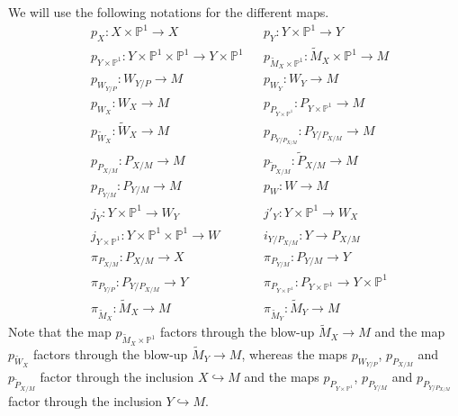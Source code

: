 \documentclass[10pt,twoside]{article}
\numberwithin{equation}{section}
\theoremstyle{plain}
\theoremstyle{definition}
\begin{document}
We will use the following notations for the different maps.
\begin{align*}
  &p_{X}\colon X\times \mathbb{P}^{1}\longrightarrow X &
  &p_{Y}\colon Y\times \mathbb{P}^{1}\longrightarrow Y\\
  &p_{Y\times \mathbb{P}^{1}}\colon Y\times \mathbb{P}^{1}\times
  \mathbb{P}^{1}\longrightarrow Y\times \mathbb{P}^{1} & 
  &p_{\widetilde M_{X}\times
  \mathbb{P}^{1}}\colon \widetilde M_{X}\times
  \mathbb{P}^{1}\longrightarrow M\\
  & p_{W_{Y/P}}\colon W_{Y/P}\longrightarrow M &
  & p_{W_{Y}}\colon W_{Y}\longrightarrow M\\
  & p_{W_{X}}\colon W_{X}\longrightarrow M &
  & p_{P_{Y\times \mathbb{P}^{1}}}\colon  P_{Y\times
    \mathbb{P}^{1}}\longrightarrow M\\
  & p_{\widetilde W_{X}}\colon \widetilde W_{X}\longrightarrow M &
  &p_{P_{Y/P_{X/M}}}\colon P_{Y/P_{X/M}}\longrightarrow M\\
  &p_{P_{X/M}}\colon P_{X/M}\longrightarrow M &
  &p_{\widetilde P_{X/M}}\colon \widetilde P_{X/M}\longrightarrow M \\
  &p_{P_{Y/M}}\colon P_{Y/M}\longrightarrow M &
  &p_{W}\colon W\longrightarrow M\\
  &j_{Y}\colon Y\times \mathbb{P}^{1}\longrightarrow W_{Y} &
  &j'_{Y}\colon Y\times \mathbb{P}^{1}\longrightarrow W_{X} \\
  &j_{Y\times \mathbb{P}^{1}}\colon Y\times \mathbb{P}^{1}\times
  \mathbb{P}^{1}\longrightarrow W&
  &i_{Y/P_{X/M}}\colon Y\longrightarrow P_{X/M}\\
  &\pi _{P_{X/M}}\colon  P_{X/M}\longrightarrow X &
  &\pi _{P_{Y/M}}\colon  P_{Y/M}\longrightarrow Y\\
  &\pi _{P_{Y/P}}\colon  P_{Y/P_{X/M}}\longrightarrow Y &
  &\pi _{P_{Y\times \mathbb{P}^{1}}}\colon  P_{Y\times
    \mathbb{P}^{1}}\longrightarrow Y\times \mathbb{P}^{1}\\
  &\pi _{\widetilde M_{X}}\colon \widetilde M_{X}\longrightarrow M&
  &\pi _{\widetilde M_{Y}}\colon \widetilde M_{Y}\longrightarrow M
\end{align*}
Note that the map $p_{\widetilde M_{X}\times \mathbb{P}^{1}}$
factors through the blow-up $\widetilde M_{X}\longrightarrow M$ and
the map $p_{\widetilde W_{X}}$ factors through the blow-up $\widetilde
M_{Y}\longrightarrow M$, whereas 
the maps $p_{W_{Y/P}}$, $p_{P_{X/M}}$ and $p_{\widetilde P_{X/M}}$
factor through the inclusion 
$X\hookrightarrow 
M$ and the maps $p_{P_{Y\times \mathbb{P}^{1}}}$, $p_{P_{Y/M}}$ and
$p_{P_{Y/P_{X/M}}}$ factor through the 
inclusion $Y\hookrightarrow M$.
\end{document}
